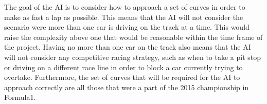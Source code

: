 The goal of the AI is to consider how to approach a set of curves in order to make as fast a lap as possible. This means that the AI will not consider the scenario were more than one car is driving on the track at a time. This would raise the complexity above one that would be reasonable within the time frame of the project. Having no more than one car on the track also means that the AI will not consider any competitive racing strategy, such as when to take a pit stop or driving on a different race line in order to block a car currently trying to overtake. Furthermore, the set of curves that will be required for the AI to approach correctly are all those that were a part of the 2015 championship in Formula1.

